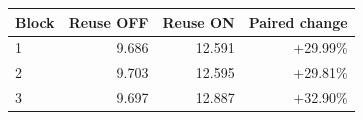 \begin{tabular}{@{}lrrr@{}}
\toprule
Block & Reuse OFF & Reuse ON & Paired change \\
\midrule
1 & 9.686 & 12.591 & +29.99\% \\
2 & 9.703 & 12.595 & +29.81\% \\
3 & 9.697 & 12.887 & +32.90\% \\
\bottomrule
\end{tabular}

